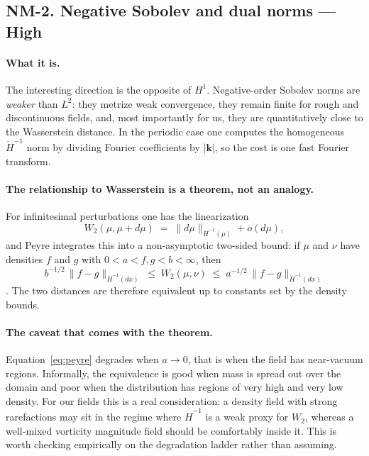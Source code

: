 \documentclass[11pt]{article}
\newcommand{\High}{\textbf{High}}
\begin{document}
\subsection{NM-2. Negative Sobolev and dual norms --- \High{}}

\paragraph{What it is.} The interesting direction is the opposite of $H^1$. Negative-order
Sobolev norms are \emph{weaker} than $L^2$: they metrize weak convergence, they remain
finite for rough and discontinuous fields, and, most importantly for us, they are
quantitatively close to the Wasserstein distance. In the periodic case one computes the
homogeneous $\dot H^{-1}$ norm by dividing Fourier coefficients by $|\mathbf{k}|$, so the
cost is one fast Fourier transform.

\paragraph{The relationship to Wasserstein is a theorem, not an analogy.} For infinitesimal
perturbations one has the linearization
\begin{equation}
W_2(\mu, \mu + d\mu) \;=\; \| d\mu \|_{\dot H^{-1}(\mu)} + o(d\mu),
\label{eq:linearization}
\end{equation}
and Peyre integrates this into a non-asymptotic two-sided bound: if $\mu$ and $\nu$ have
densities $f$ and $g$ with $0 < a < f, g < b < \infty$, then
\begin{equation}
b^{-1/2}\, \| f - g \|_{\dot H^{-1}(dx)} \;\le\; W_2(\mu,\nu) \;\le\;
a^{-1/2}\, \| f - g \|_{\dot H^{-1}(dx)}
\label{eq:peyre}
\end{equation}
\cite{peyre2018}. The two distances are therefore equivalent up to constants set by the
density bounds.

\paragraph{The caveat that comes with the theorem.} Equation~\eqref{eq:peyre} degrades when
$a \to 0$, that is when the field has near-vacuum regions. Informally, the equivalence is
good when mass is spread out over the domain and poor when the distribution has regions of
very high and very low density. For our fields this is a real consideration: a density field
with strong rarefactions may sit in the regime where $\dot H^{-1}$ is a weak proxy for
$W_2$, whereas a well-mixed vorticity magnitude field should be comfortably inside it. This
is worth checking empirically on the degradation ladder rather than assuming.
\end{document}
